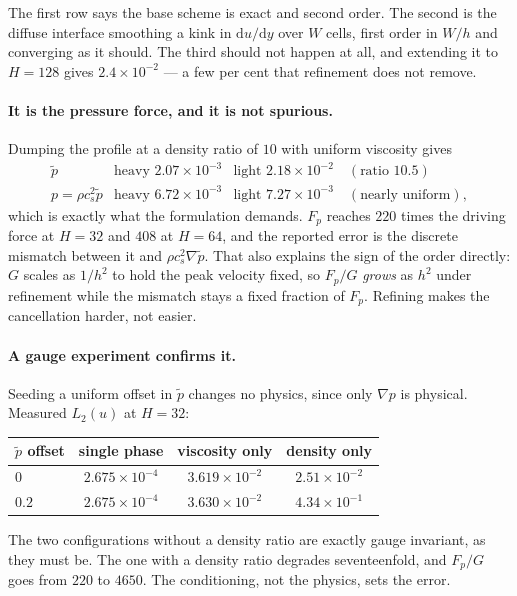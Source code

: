 \documentclass[11pt,a4paper]{article}
\newcommand{\cs}{c_s}
\newcommand{\e}[1]{\times 10^{#1}}
\begin{document}
\noindent The first row says the base scheme is exact and second order. The second
is the diffuse interface smoothing a kink in $\mathrm{d}u/\mathrm{d}y$ over $W$
cells, first order in $W/h$ and converging as it should. The third should not
happen at all, and extending it to $H=128$ gives $2.4\e{-2}$ --- a few per cent
that refinement does not remove.

\paragraph{It is the pressure force, and it is not spurious.} Dumping the profile
at a density ratio of $10$ with uniform viscosity gives
\[
\begin{array}{lll}
  \tilde p              & \text{heavy } 2.07\e{-3} & \text{light } 2.18\e{-2}
                        \quad (\text{ratio } 10.5) \\
  p = \rho\cs^2\tilde p & \text{heavy } 6.72\e{-3} & \text{light } 7.27\e{-3}
                        \quad (\text{nearly uniform}),
\end{array}
\]
which is exactly what the formulation demands. $F_p$ reaches $220$ times the
driving force at $H=32$ and $408$ at $H=64$, and the reported error is the
discrete mismatch between it and $\rho\cs^2\nabla\tilde p$. That also explains the
sign of the order directly: $G$ scales as $1/h^2$ to hold the peak velocity fixed,
so $F_p/G$ \emph{grows} as $h^2$ under refinement while the mismatch stays a fixed
fraction of $F_p$. Refining makes the cancellation harder, not easier.

\paragraph{A gauge experiment confirms it.} Seeding a uniform offset in $\tilde p$
changes no physics, since only $\nabla p$ is physical. Measured $L_2(u)$ at
$H=32$:

\begin{center}\small
\begin{tabular}{lccc}
\toprule
$\tilde p$ offset & single phase & viscosity only & density only \\
\midrule
$0$   & $2.675\e{-4}$ & $3.619\e{-2}$ & $2.51\e{-2}$ \\
$0.2$ & $2.675\e{-4}$ & $3.630\e{-2}$ & $4.34\e{-1}$ \\
\bottomrule
\end{tabular}
\end{center}

\noindent The two configurations without a density ratio are exactly gauge
invariant, as they must be. The one with a density ratio degrades seventeenfold,
and $F_p/G$ goes from $220$ to $4650$. The conditioning, not the physics, sets the
error.
\end{document}
